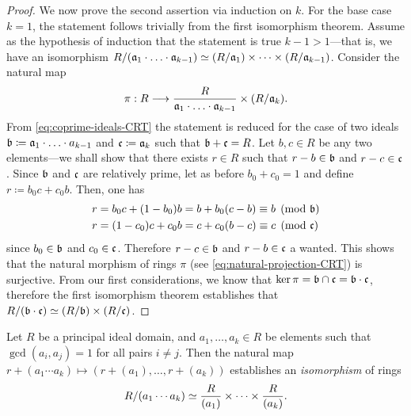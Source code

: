 \begin{proof}
We now prove the second assertion via induction on \(k\). For the base case
\(k = 1\), the statement follows trivially from the first isomorphism
theorem. Assume as the hypothesis of induction that the statement is true
\(k - 1 > 1\)---that is, we have an isomorphism
\(R/(\mathfrak{a}_1 \cdot \ldots \cdot \mathfrak{a}_{k-1}) \simeq (R/\mathfrak{a}_1) \times
\dots \times (R/\mathfrak{a}_{k-1})\). Consider the natural map
\begin{equation}\label{eq:natural-projection-CRT}
\pi: R \longrightarrow \frac{R}{\mathfrak{a}_{1} \cdot \ldots \cdot \mathfrak{a}_{k-1}}
\times (R/\mathfrak{a}_k).
\end{equation}
From \cref{eq:coprime-ideals-CRT} the statement is reduced for the case of two
ideals \(\mathfrak{b} \coloneq \mathfrak{a}_1 \cdot \ldots \cdot a_{k-1}\) and
\(\mathfrak{c} \coloneq \mathfrak{a}_k\) such that \(\mathfrak{b} + \mathfrak{c} = R\). Let
\(b, c \in R\) be any two elements---we shall show that there exists \(r \in R\)
such that \(r - b \in \mathfrak{b}\) and \(r - c \in \mathfrak{c}\). Since \(\mathfrak{b}\)
and \(\mathfrak{c}\) are relatively prime, let as before \(b_0 + c_0 = 1\) and
define \(r \coloneq b_0 c + c_0 b\). Then, one has
\begin{align*}
  r &= b_0 c + (1 - b_0) b = b + b_0 (c - b) \equiv b \pmod{\mathfrak{b}} \\
  r &= (1 - c_0) c + c_0 b = c + c_0 (b - c) \equiv c \pmod{\mathfrak{c}}
\end{align*}
since \(b_0 \in \mathfrak{b}\) and \(c_0 \in \mathfrak{c}\). Therefore
\(r - c \in \mathfrak{b}\) and \(r - b \in \mathfrak{c}\) a wanted. This shows that the
natural morphism of rings \(\pi\) (see \cref{eq:natural-projection-CRT}) is
surjective. From our first considerations, we know that
\(\ker \pi = \mathfrak{b} \cap \mathfrak{c} = \mathfrak{b} \cdot \mathfrak{c}\), therefore the
first isomorphism theorem establishes that
\(R/(\mathfrak{b} \cdot \mathfrak{c}) \simeq (R/\mathfrak{b}) \times (R/\mathfrak{c})\).
\end{proof}

\begin{corollary}
\label{cor:chinese-remainder-for-PID}
Let \(R\) be a principal ideal domain, and \(a_1, \dots, a_k \in R\) be elements
such that \(\gcd(a_i, a_j) = 1\) for all pairs \(i \neq j\). Then the natural
map \(r + (a_1 \cdots a_k) \mapsto (r + (a_1), \dots, r + (a_k))\) establishes an
\emph{isomorphism} of rings
\[
R/(a_1 \cdots a_k) \simeq \frac{R}{(a_{1})} \times \dots \times \frac{R}{(a_k)}.
\]
\end{corollary}

